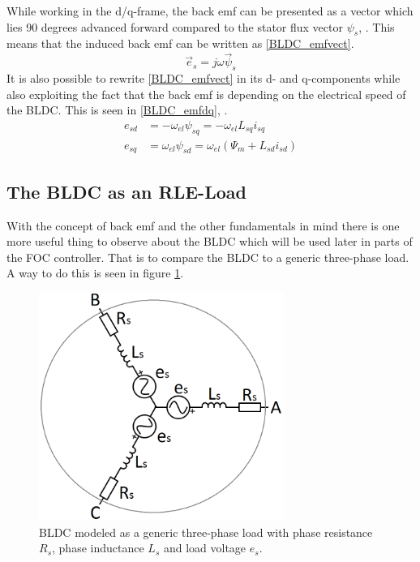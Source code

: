 \documentclass{LTHthesis}
\begin{document}
While working in the d/q-frame, the back emf can be presented as a vector which lies 90 degrees advanced forward compared to the stator flux vector $\psi_s$, \cite{ala_kar2014}. This means that the induced back emf can be written as \eqref{BLDC_emfvect}.
\begin{equation} \label{BLDC_emfvect}
\vec{e}_s=j\omega\vec{\psi}_s
\end{equation}
It is also possible to rewrite \eqref{BLDC_emfvect} in its d- and q-components while also exploiting the fact that the back emf is depending on the electrical speed of the BLDC. This is seen in \eqref{BLDC_emfdq}, \cite{ala_kar2014}.
\begin{subequations} \label{BLDC_emfdq}
\begin{align} 
e_{sd}&=-\omega_{el}\psi_{sq}=-\omega_{el}L_{sq}i_{sq}\\
e_{sq}&=\omega_{el}\psi_{sd}=\omega_{el}(\Psi_m+L_{sd}i_{sd})
\end{align}
\end{subequations}

\subsection{The BLDC as an RLE-Load}
With the concept of back emf and the other fundamentals in mind there is one more useful thing to observe about the BLDC which will be used later in parts of the FOC controller. That is to compare the BLDC to a generic three-phase load. A way to do this is seen in figure \ref{BLDC_rle}.
\begin{figure}
\centering
\includegraphics[width=8cm]{rle}
\caption{BLDC modeled as a generic three-phase load with phase resistance $R_s$, phase inductance $L_s$ and load voltage $e_s$.}
\label{BLDC_rle}
\end{figure}
\end{document}
